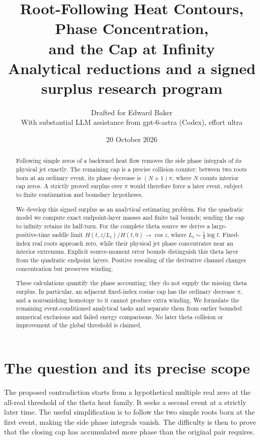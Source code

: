 \documentclass[11pt]{article}
\title{Root-Following Heat Contours, Phase Concentration,\\
and the Cap at Infinity\\
\large Analytical reductions and a signed surplus research program}
\author{Drafted for Edward Baker\\
\small With substantial LLM assistance from gpt-6-astra (Codex), effort ultra}
\date{20 October 2026}
\theoremstyle{definition}
\begin{document}
\maketitle
\begin{abstract}
Following simple zeros of a backward heat flow removes the side phase
integrals of its physical jet exactly. The remaining cap is a precise
collision counter: between two roots born at an ordinary event, its
phase decrease is \((N+1)\pi\), where \(N\) counts interior cap zeros.
A strictly proved surplus over \(\pi\) would therefore force a later
event, subject to finite continuation and boundary hypotheses.

We develop this signed surplus as an analytical estimating problem.
For the quadratic model we compute exact endpoint-layer masses and
finite tail bounds; sending the cap to infinity retains its half-turn.
For the complete theta source we derive a large-positive-time saddle
limit \(H(t,z/L_t)/H(t,0)\to\cos z\), where \(L_t\sim\frac14\log t\).
Fixed-index real roots approach zero, while their physical jet phase
concentrates near an interior extremum. Explicit source-moment error
bounds distinguish this theta layer from the quadratic endpoint layers.
Positive rescaling of the derivative channel changes concentration but
preserves winding.

These calculations quantify the phase accounting; they do not supply
the missing theta surplus. In particular, an adjacent fixed-index
cosine cap has the ordinary decrease \(\pi\), and a nonvanishing homotopy
to it cannot produce extra winding. We formulate the remaining
event-conditioned analytical tasks and separate them from earlier
bounded numerical exclusions and failed energy comparisons.
No later theta collision or improvement of the global threshold is claimed.
\end{abstract}
\tableofcontents

\section{The question and its precise scope}
\label{sec:scope}
The proposed contradiction starts from a hypothetical multiple real zero
at the all-real threshold of the theta heat family. It seeks a second
event at a strictly later time. The useful simplification is to follow
the two simple roots born at the first event, making the side phase
integrals vanish. The difficulty is then to prove that the closing cap
has accumulated more phase than the original pair requires.
\end{document}
